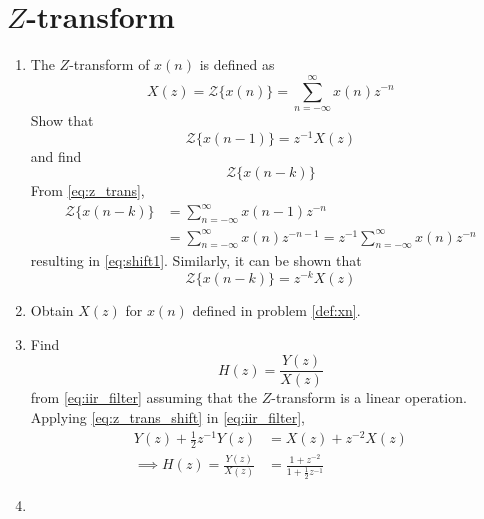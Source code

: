 \documentclass[journal,12pt,twocolumn]{IEEEtran}
\renewcommand\thesection{\arabic{section}}
\begin{document}
	\section{$Z$-transform}
	\begin{enumerate}[label=\thesection.\arabic*]
		\item The $Z$-transform of $x(n)$ is defined as
		\begin{equation}
			\label{eq:z_trans}
			X(z)={\mathcal {Z}}\{x(n)\}=\sum _{n=-\infty }^{\infty }x(n)z^{-n}
		\end{equation}
		Show that
		\begin{equation}
			\label{eq:shift1}
			{\mathcal {Z}}\{x(n-1)\} = z^{-1}X(z)
		\end{equation}
		and find
		\begin{equation}
			{\mathcal {Z}}\{x(n-k)\} 
		\end{equation}
		\solution From \eqref{eq:z_trans},
		\begin{align}
			{\mathcal {Z}}\{x(n-k)\} &=\sum _{n=-\infty }^{\infty }x(n-1)z^{-n}
			\\
			&=\sum _{n=-\infty }^{\infty }x(n)z^{-n-1} = z^{-1}\sum _{n=-\infty }^{\infty }x(n)z^{-n}
		\end{align}
		resulting in \eqref{eq:shift1}. Similarly, it can be shown that
		\begin{equation}
			\label{eq:z_trans_shift}
			{\mathcal {Z}}\{x(n-k)\} = z^{-k}X(z)
		\end{equation}
		\item Obtain $X(z)$ for $x(n)$ defined in problem 
		\ref{def:xn}.
		\item Find
		\begin{equation}
			H(z) = \frac{Y(z)}{X(z)}
		\end{equation}
		from  \eqref{eq:iir_filter} assuming that the $Z$-transform is a linear operation.
		\\
		\solution  Applying \eqref{eq:z_trans_shift} in \eqref{eq:iir_filter},
		\begin{align}
			Y(z) + \frac{1}{2}z^{-1}Y(z) &= X(z)+z^{-2}X(z)
			\\
			\implies H(z) = \frac{Y(z)}{X(z)} &= \frac{1 + z^{-2}}{1 + \frac{1}{2}z^{-1}}
			\label{eq:freq_resp}
		\end{align}
		\item 
		\begin{enumerate}
	

\end{enumerate}
\end{enumerate}
\end{document}

